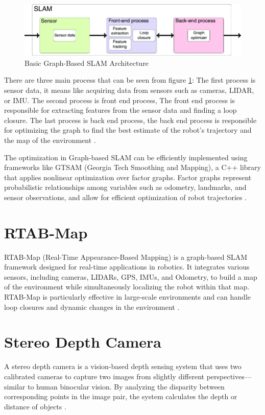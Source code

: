 \begin{figure}[H]
	\centering
	\includegraphics[width=\linewidth]{../konten/gb_slam.png}
	\caption{Basic Graph-Based SLAM Architecture \cite{ref_gb_slam}}
	\label{fig:basic_graph_based_slam}
\end{figure} 

There are three main process that can be seen from figure \ref{fig:basic_graph_based_slam}: The first process is sensor data, it means like acquiring data from sensors such as cameras, LIDAR, or IMU. The second process is front end process, The front end process is responsible for extracting features from the sensor data and finding a loop closure. The last process is back end process, the back end process is responsible for optimizing the graph to find the best estimate of the robot's trajectory and the map of the environment \cite{ref_gb_slam}.

\par
The optimization in Graph-based SLAM can be efficiently implemented using frameworks like GTSAM (Georgia Tech Smoothing and Mapping), a C++ library that applies nonlinear optimization over factor graphs. Factor graphs represent probabilistic relationships among variables such as odometry, landmarks, and sensor observations, and allow for efficient optimization of robot trajectories \cite{ref_gtsam}.

\section{RTAB-Map}
RTAB-Map (Real-Time Appearance-Based Mapping) is a graph-based SLAM framework designed for real-time applications in robotics. It integrates various sensors, including cameras, LIDARs, GPS, IMUs, and Odometry, to build a map of the environment while simultaneously localizing the robot within that map. RTAB-Map is particularly effective in large-scale environments and can handle loop closures and dynamic changes in the environment \cite{ref_rtabmap}.

\section{Stereo Depth Camera}
A stereo depth camera is a vision-based depth sensing system that uses two calibrated cameras to capture two images from slightly different perspectives—similar to human binocular vision. By analyzing the disparity between corresponding points in the image pair, the system calculates the depth or distance of objects \cite{scharstein2002taxonomy}.

